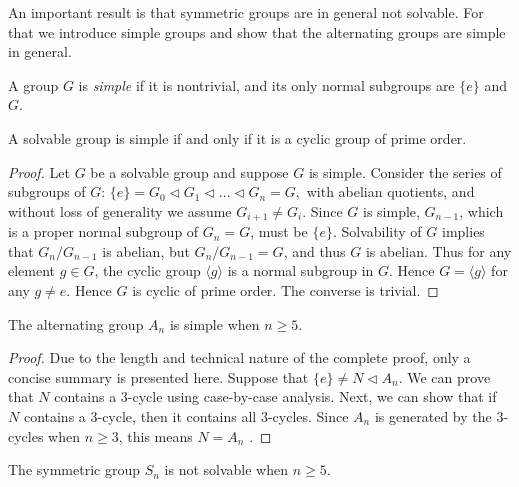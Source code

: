 An important result is that symmetric groups are in general not solvable.
For that we introduce simple groups and show that the alternating groups are simple in general. 

\begin{definition}
	A group $G$ is \textit{simple} if it is nontrivial, and its only normal subgroups are $\{ e \}$ and $G$. 
\end{definition}

\begin{theorem} \label{thm:soluble-and-simple}
	A solvable group is simple if and only if it is a cyclic group of prime order.
\end{theorem}

\begin{proof}
	Let $G$ be a solvable group and suppose $G$ is simple. Consider the series of subgroups of $G$: 
	$
	\{ e \}=G_0 \triangleleft G_1 \triangleleft \ldots \triangleleft G_n=G,
	$
	with abelian quotients, and without loss of generality we assume $G_{i+1} \neq G_i$. Since $G$ is simple, $G_{n-1}$, which is a proper normal subgroup of $G_n = G$, must be $\{ e \}$. Solvability of $G$ implies that $G_n / G_{n -1 }$ is abelian, but $G_n / G_{n - 1} = G$, and thus $G$ is abelian. Thus for any element $g \in G$, the cyclic group $\langle g\rangle$ is a normal subgroup in $G$. Hence  $G = \langle g\rangle$ for any $g \neq e$. Hence $G$ is cyclic of prime order.
	The converse is trivial.
\end{proof}


\begin{theorem} \label{thm:simple-alternating}
	The alternating group $A_n$ is simple when $n \ge 5$. 
\end{theorem}

\begin{proof}
	Due to the length and technical nature of the complete proof, only a concise summary is presented here. 
	Suppose that $\{ e \} \neq N \triangleleft A_n$. We can prove that $N$ contains a $3$-cycle using case-by-case analysis. Next, we can show that if $N$ contains a $3$-cycle, then it contains all $3$-cycles. Since $A_n$ is generated by the $3$-cycles when $n \ge 3$, this means $N = A_n$ \cite[p.~164]{Stewart}.
\end{proof}

\begin{theorem} \label{thm:symmetric-not-soluble-appendix}
	The symmetric group $S_n$ is not solvable when $n \ge 5$. 
\end{theorem}


